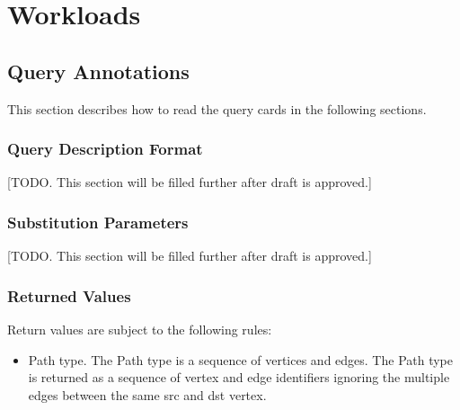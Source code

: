 \chapter{Workloads}
\label{sec:workloads}

\section{Query Annotations}

This section describes how to read the query cards in the following sections.
\subsection{Query Description Format}
\label{subsec:query-description-format}
 [TODO. This section will be filled further after draft is approved.]


\subsection{Substitution Parameters}
\label{subsec:substitution-parameters}
 [TODO. This section will be filled further after draft is approved.]


\subsection{Returned Values}
\label{subsec:returned-values}

Return values are subject to the following rules:
\begin{itemize}
    \item Path type. The Path type is a sequence of vertices and edges. The
          Path type is returned as a sequence of vertex and edge identifiers
          ignoring the multiple edges between the same src and dst vertex.
\end{itemize}


